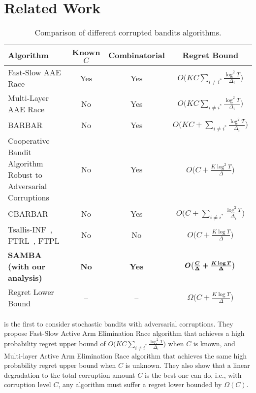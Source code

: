 \section{Related Work}
\begin{table*}[!ht] %
    \renewcommand\arraystretch{2}
    \centering
    \caption{Comparison of different corrupted bandits algorithms. }\label{Table_1} 
    \begin{tabular}{|p{5.5cm}|c|c|c|}
    \hline
    \textbf{Algorithm} &\textbf{Known} $C$ &\textbf{Combinatorial} & \textbf{Regret Bound}\\ \hline
     Fast-Slow AAE Race~\cite{lykouris2018stochastic} & Yes & Yes& $O\big(KC\sum_{i\neq i^*}\frac{\log^2 T}{\Delta_i}\big)$ \\ \hline%
     Multi-Layer AAE Race~\cite{lykouris2018stochastic} & No & Yes& $O\big(KC\sum_{i\neq i^*}\frac{\log^2 T}{\Delta_i}\big)$\\ \hline
    BARBAR~\cite{gupta2019better} & No & Yes& $O\big(KC+\sum_{i\neq i^*}\frac{\log^2 T}{\Delta_i}\big)$\\ \hline
    Cooperative Bandit Algorithm Robust to Adversarial Corruptions~\cite{liu2021cooperative} & No & Yes& $O\big(C+\frac{K\log^2 T}{\Delta}\big)$\\ \hline 
    CBARBAR~\cite{xu2021simple}  & No & Yes& $O\big(C+\sum_{i\neq i^*}\frac{\log^2 T}{\Delta_{i}}\big)$\\ \hline
    Tsallis-INF~\cite{zimmert2021tsallis}, FTRL~\cite{jin2020simultaneously}, FTPL~\cite{honda2023follow} & No & No& $O\big(C+\frac{K\log T}{\Delta}\big)$\\ \hline 
    \textbf{SAMBA~\cite{denisov2020regret} (with our analysis)} & \textbf{No} & \textbf{Yes} & $\boldmath{O\big(\frac{C}{\Delta}+\frac{K\log T}{\Delta}\big)}$ \\ \hline
    Regret Lower Bound~\cite{lykouris2018stochastic}& -- & -- & $\Omega\big(C+\frac{K\log T}{\Delta}\big)$\\ \hline
    \end{tabular}
\end{table*}



\citet{lykouris2018stochastic} is the first to consider stochastic bandits with adversarial corruptions.
%
They propose Fast-Slow Active Arm Elimination Race algorithm that achieves a high probability regret upper bound of $O\big(KC\sum_{i\neq i^*}\frac{\log^2 T}{\Delta_i}\big)$ when $C$ is known, and Multi-layer Active Arm Elimination Race algorithm that achieves the same high probability regret upper bound when $C$ is unknown.
They also show that a linear degradation to the total corruption amount $C$ is the best one can do, i.e., with corruption level $C$, any algorithm must suffer a regret lower bounded by $\Omega(C)$. 

